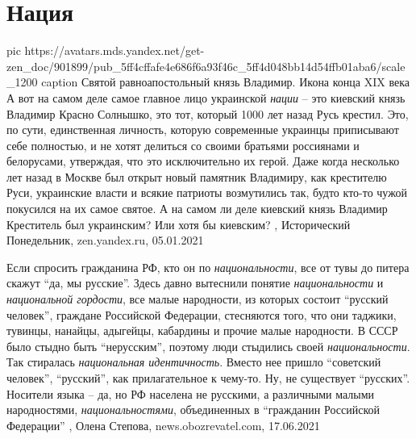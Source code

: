  
 
 
 
 
\chapter{Нация}
\label{sec:slova.nacia}

\ifcmt
  pic https://avatars.mds.yandex.net/get-zen_doc/901899/pub_5ff4cffafe4e686f6a93f46c_5ff4d048bb14d54ffb01aba6/scale_1200
	caption Святой равноапостольный князь Владимир. Икона конца XIX века
\fi
А вот на самом деле самое главное лицо украинской \emph{нации} – это киевский
князь Владимир Красно Солнышко, это тот, который 1000 лет назад Русь крестил.
Это, по сути, единственная личность, которую современные украинцы приписывают
себе полностью, и не хотят делиться со своими братьями россиянами и белорусами,
утверждая, что это исключительно их герой.  Даже когда несколько лет назад в
Москве был открыт новый памятник Владимиру, как крестителю Руси, украинские
власти и всякие патриоты возмутились так, будто кто-то чужой покусился на их
самое святое. А на самом ли деле киевский князь Владимир Креститель был
украинским? Или хотя бы киевским?
,
Исторический Понедельник, zen.yandex.ru, 05.01.2021 

Если спросить гражданина РФ, кто он по \emph{национальности}, все от тувы до питера
скажут \enquote{да, мы русские}. Здесь давно вытеснили понятие \emph{национальности} и
\emph{национальной гордости}, все малые народности, из которых состоит \enquote{русский
человек}, граждане Российской Федерации, стесняются того, что они таджики,
тувинцы, нанайцы, адыгейцы, кабардины и прочие малые народности. В СССР было
стыдно быть \enquote{нерусским}, поэтому люди стыдились своей \emph{национальности}. Так
стиралась \emph{национальная идентичность}. Вместо нее пришло \enquote{советский человек},
\enquote{русский}, как прилагательное к чему-то.  Ну, не существует \enquote{русских}. Носители
языка – да, но РФ населена не русскими, а различными малыми народностями,
\emph{национальностями}, объединенных в \enquote{гражданин Российской Федерации}
, 
Олена Степова, news.obozrevatel.com, 17.06.2021
